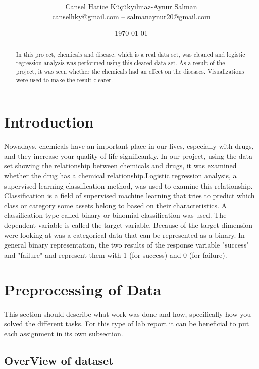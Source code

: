 \documentclass[onecolumn]{article}
\title{\spacecaps{Final Report : Logistic Regression }\\ \normalsize \spacesc{CENG 3521 , DATA MINING} }
\author{Cansel Hatice Küçükyılmaz-Aynur Salman\\canselhky@gmail.com – salmanaynur20@gmail.com}
\date{\today}
\begin{document}
\maketitle

\begin{abstract}
In this project, chemicals and disease, which is a real data set, was cleaned and logistic regression analysis was performed using this cleared data set. As a result of the project, it was seen whether the chemicals had an effect on the diseases. Visualizations were used to make the result clearer.
\end{abstract}


\section{Introduction}
Nowadays, chemicals have an important place in our lives, especially with drugs, and they increase your quality of life significantly. In our project, using the data set showing the relationship between chemicals and drugs, it was examined whether the drug has a chemical relationship.Logistic regression analysis, a supervised learning classification method, was used to examine this relationship. Classification is a field of supervised machine learning that tries to predict which class or category some assets belong to based on their characteristics. A classification type called binary or binomial classification was used. The dependent variable is  called the target variable. Because  of the target dimension were looking at was a categorical data that can be represented as a binary. In general binary representation, the two results of the response variable "success" and "failure" and represent them with 1 (for success) and 0 (for failure).
\section{Preprocessing of Data}
This section should describe what work was done and how, specifically how you solved the different tasks. For this type of lab report it can be beneficial to put each assignment in its own subsection.

\subsection{OverView of dataset}
\end{document}

